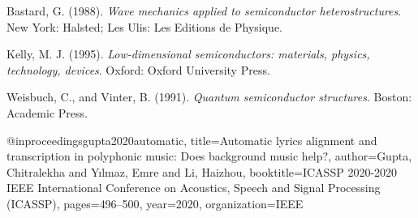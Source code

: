\begin{thebibliography}{99}

Bastard, G. (1988).
\textit{Wave mechanics applied to semiconductor heterostructures}.
New York: Halsted; Les Ulis: Les Editions de Physique.

Kelly, M. J. (1995).
\textit{Low-dimensional semiconductors: materials, physics, technology, devices}.
Oxford: Oxford University Press.

Weisbuch, C., and Vinter, B. (1991).
\textit{Quantum semiconductor structures}.
Boston: Academic Press.

@inproceedings{gupta2020automatic,
  title={Automatic lyrics alignment and transcription in polyphonic music: Does background music help?},
  author={Gupta, Chitralekha and Y{\i}lmaz, Emre and Li, Haizhou},
  booktitle={ICASSP 2020-2020 IEEE International Conference on Acoustics, Speech and Signal Processing (ICASSP)},
  pages={496--500},
  year={2020},
  organization={IEEE}
}

\end{thebibliography} 
